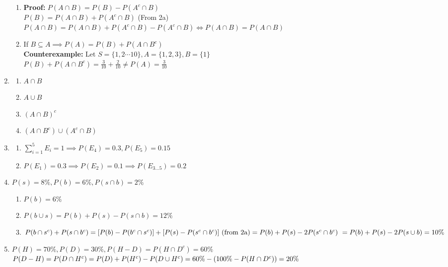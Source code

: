 \documentclass{article}
\newcommand{\proof}[1]{\textbf{Proof: #1}}
\newcommand{\counter}[1]{\textbf{Counterexample: #1}}
\newcommand{\set}[1]{\{#1\}}
\begin{document}
\begin{enumerate}
\begin{enumerate}
      \item \proof{}$P(A\cap B) = P(B) - P(A^c \cap B)$\\
      $P(B) = P(A\cap B) + P(A^c\cap B)$ (From 2a)\\
      $P(A\cap B) = P(A\cap B) + P(A^c\cap B) - P(A^c \cap B) \iff P(A\cap B) = P(A\cap B)$

      \item If $B\subseteq A \implies P(A) = P(B) + P(A\cap B^c)$\\
      \counter{}Let $S = \set{1,2\cdots 10}, A = \set{1,2,3}, B = \set{1}$\\
      $P(B) + P(A\cap B^c) = \frac{3}{10} + \frac{2}{10} \neq P(A) = \frac{3}{10}$\\
    \end{enumerate}
    \item \begin{enumerate}
      \item $A\cap B$
      \item $A\cup B$
      \item $(A\cap B)^c$
      \item $(A\cap B^c) \cup (A^c \cap B)$
    \end{enumerate}

    \item \begin{enumerate}
      \item $\sum_{i=1}^{5}E_i = 1 \implies P(E_4) = 0.3, P(E_5) = 0.15 $
      \item $P(E_1) = 0.3 \implies P(E_2) = 0.1 \implies P(E_{3...5}) = 0.2$
    \end{enumerate}
    
    \newpage

    \item $P(s) = 8\%, P(b) = 6\%, P(s \cap b) = 2\%$ 
    \begin{enumerate}
      \item $P(b) = 6\%$
      \item $P(b \cup s) = P(b) + P(s) - P(s \cap b) = 12\%$
      \item $P(b \cap s^c) + P(s \cap b^c)\\
      = [P(b) - P(b^c \cap s^c)] + [P(s) - P(s^c\cap b^c)] \text{ (from 2a)}\\
      = P(b) + P(s) - 2P(s^c\cap b^c)\\\
      = P(b) + P(s) - 2P(s \cup b) = 10\%$
    \end{enumerate}
    
    \item $P(H) = 70\%, P(D) = 30\%, P(H - D) = P(H \cap D^c) = 60\%$\\
    $P(D - H) = P(D \cap H^c)\\
    = P(D) + P(H^c) - P(D\cup H^c)\\
    = 60\% - (100\% - P(H\cap D^c)) = 20\%$
    

\end{enumerate}
\end{document}
